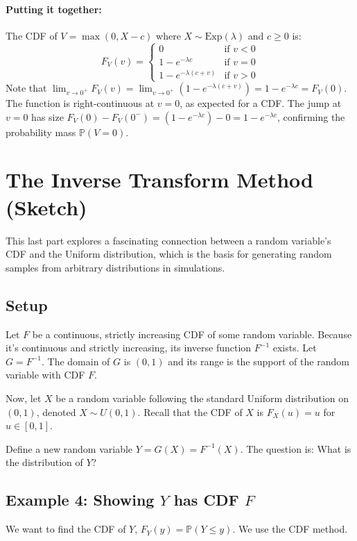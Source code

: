 \documentclass[11pt]{article}
\theoremstyle{mytheoremstyle}
\theoremstyle{mydefinitionstyle}
\newcommand{\Prob}{\mathbb{P}} %
\begin{document}
\paragraph{Putting it together:}
The CDF of $V = \max(0, X-c)$ where $X \sim \text{Exp}(\lambda)$ and $c \ge 0$ is:
\[
F_V(v) = \begin{cases}
0 & \text{if } v < 0 \\
1 - e^{-\lambda c} & \text{if } v = 0 \\
1 - e^{-\lambda(c+v)} & \text{if } v > 0
\end{cases}
\]
Note that $\lim_{v \to 0^+} F_V(v) = \lim_{v \to 0^+} (1 - e^{-\lambda(c+v)}) = 1 - e^{-\lambda c} = F_V(0)$. The function is right-continuous at $v=0$, as expected for a CDF.
The jump at $v=0$ has size $F_V(0) - F_V(0^-) = (1 - e^{-\lambda c}) - 0 = 1 - e^{-\lambda c}$, confirming the probability mass $\Prob(V=0)$.

\section{The Inverse Transform Method (Sketch)}

This last part explores a fascinating connection between a random variable's CDF and the Uniform distribution, which is the basis for generating random samples from arbitrary distributions in simulations.

\subsection{Setup}
Let $F$ be a continuous, strictly increasing CDF of some random variable. Because it's continuous and strictly increasing, its inverse function $F^{-1}$ exists. Let $G = F^{-1}$. The domain of $G$ is $(0, 1)$ and its range is the support of the random variable with CDF $F$.

Now, let $X$ be a random variable following the standard Uniform distribution on $(0, 1)$, denoted $X \sim U(0, 1)$. Recall that the CDF of $X$ is $F_X(u) = u$ for $u \in [0, 1]$.

Define a new random variable $Y = G(X) = F^{-1}(X)$. The question is: What is the distribution of $Y$?

\subsection{Example 4: Showing $Y$ has CDF $F$}

We want to find the CDF of $Y$, $F_Y(y) = \Prob(Y \le y)$. We use the CDF method.
\end{document}
